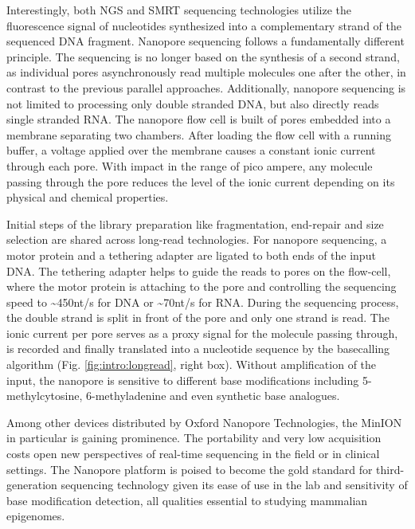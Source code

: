 Interestingly, both NGS and SMRT sequencing technologies utilize the fluorescence signal of nucleotides synthesized into a complementary strand of the sequenced DNA fragment.
Nanopore sequencing follows a fundamentally different principle.
The sequencing is no longer based on the synthesis of a second strand, as individual pores asynchronously read multiple molecules one after the other, in contrast to the previous parallel approaches.
Additionally, nanopore sequencing is not limited to processing only double stranded DNA, but also directly reads single stranded RNA.
The nanopore flow cell is built of pores embedded into a membrane separating two chambers.
After loading the flow cell with a running buffer, a voltage applied over the membrane causes a constant ionic current through each pore.
With impact in the range of pico ampere, any molecule passing through the pore reduces the level of the ionic current depending on its physical and chemical properties.

Initial steps of the library preparation like fragmentation, end-repair and size selection are shared across long-read technologies.
For nanopore sequencing, a motor protein and a tethering adapter are ligated to both ends of the input DNA.
The tethering adapter helps to guide the reads to pores on the flow-cell, where the motor protein is attaching to the pore and controlling the sequencing speed to \textasciitilde450nt/s for DNA or \textasciitilde70nt/s for RNA.
During the sequencing process, the double strand is split in front of the pore and only one strand is read.
The ionic current per pore serves as a proxy signal for the molecule passing through, is recorded and finally translated into a nucleotide sequence by the basecalling algorithm (Fig. \ref{fig:intro:longread}, right box).
Without amplification of the input, the nanopore is sensitive to different base modifications including 5-methylcytosine, 6-methyladenine and even synthetic base analogues.

Among other devices distributed by Oxford Nanopore Technologies, the MinION in particular is gaining prominence. 
The portability and very low acquisition costs open new perspectives of real-time sequencing in the field or in clinical settings.
The Nanopore platform is poised to become the gold standard for third-generation sequencing technology given its ease of use in the lab and sensitivity of base modification detection, all qualities essential to studying mammalian epigenomes. 



